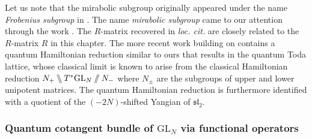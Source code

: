\begin{remark}
Let us note that the mirabolic subgroup originally appeared under the name \emph{Frobenius subgroup} in \cite{arutyunov_quantum_1996}. The name \emph{mirabolic subgroup} came to our attention through the work \cite{kalmykov_yangians_2025}. The $R$-matrix recovered in \emph{loc. cit.} are closely related to the $R$-matrix $R$ in this chapter. The more recent work \cite{kalmykov_shuffle_2026} building on \cite{kalmykov_yangians_2025} contains a quantum Hamiltonian reduction similar to ours that results in the quantum Toda lattice, whose classical limit is known \cite{feher_regularization_1997} to arise from the classical Hamiltonian reduction $N_+ \bbslash T^* \mathrm{GL}_N \mathbin{/\!\!/} N_-$ where $N_\pm$ are the subgroups of upper and lower unipotent matrices. The quantum Hamiltonian reduction is furthermore identified with a quotient of the $(-2N)$-shifted Yangian of $\mathfrak{sl}_2$.
\end{remark}

\subsubsection{Quantum cotangent bundle of $\mathrm{GL}_N$ via functional operators}

